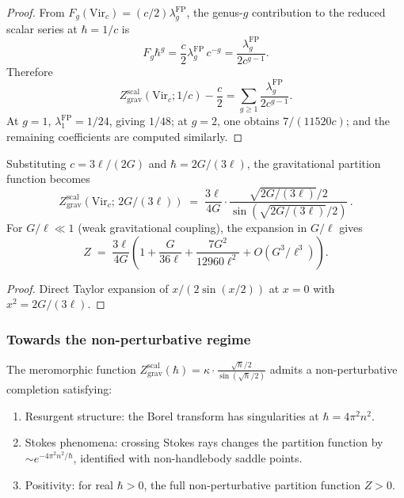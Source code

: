 \begin{proof}
From $F_g(\mathrm{Vir}_c) = (c/2)\lambda_g^{\mathrm{FP}}$, the
genus-$g$ contribution to the reduced scalar series at $\hbar = 1/c$ is
\[
F_g \hbar^g = \frac{c}{2}\lambda_g^{\mathrm{FP}}\,c^{-g}
= \frac{\lambda_g^{\mathrm{FP}}}{2c^{g-1}}.
\]
Therefore
\[
Z_{\mathrm{grav}}^{\mathrm{scal}}(\mathrm{Vir}_c;1/c) - \frac{c}{2}
= \sum_{g \geq 1} \frac{\lambda_g^{\mathrm{FP}}}{2c^{g-1}}.
\]
At $g = 1$, $\lambda_1^{\mathrm{FP}} = 1/24$, giving $1/48$; at
$g = 2$, one obtains $7/(11520c)$; and the remaining coefficients are
computed similarly.
\end{proof}

\begin{proposition}
\label{prop:thqg-I-newton-expansion}
Substituting $c = 3\ell/(2G)$ and $\hbar = 2G/(3\ell)$, the gravitational partition function becomes
\begin{equation}\label{eq:thqg-I-newton-expansion}
Z_{\mathrm{grav}}^{\mathrm{scal}}(\mathrm{Vir}_c;\,2G/(3\ell)) \;=\; \frac{3\ell}{4G} \cdot \frac{\sqrt{2G/(3\ell)}/2}{\sin(\sqrt{2G/(3\ell)}/2)}\,.
\end{equation}
For $G/\ell \ll 1$ (weak gravitational coupling), the expansion in $G/\ell$ gives
\begin{equation}\label{eq:thqg-I-G-expansion}
Z \;=\; \frac{3\ell}{4G}\left(1 + \frac{G}{36\ell} + \frac{7G^2}{12960\ell^2} + O(G^3/\ell^3)\right).
\end{equation}
\end{proposition}

\begin{proof}
Direct Taylor expansion of $x/(2\sin(x/2))$ at $x = 0$ with $x^2 = 2G/(3\ell)$.
\end{proof}

\subsubsection{Towards the non-perturbative regime}

\begin{conjecture}
\label{conj:thqg-I-non-perturbative}
The meromorphic function $Z^{\mathrm{scal}}_{\mathrm{grav}}(\hbar) = \kappa \cdot \frac{\sqrt{\hbar}/2}{\sin(\sqrt{\hbar}/2)}$ admits a non-perturbative completion satisfying:
\begin{enumerate}[label=\textup{(\roman*)}]
\item Resurgent structure: the Borel transform has singularities at $\hbar = 4\pi^2 n^2$.
\item Stokes phenomena: crossing Stokes rays changes the partition function by $\sim e^{-4\pi^2 n^2/\hbar}$, identified with non-handlebody saddle points.
\item Positivity: for real $\hbar > 0$, the full non-perturbative partition function $Z > 0$.
\end{enumerate}
\end{conjecture}

